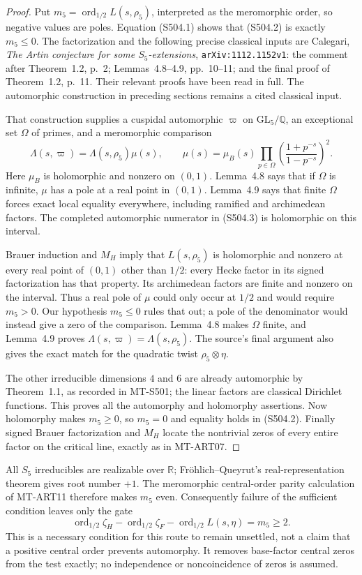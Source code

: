 \begin{proof}
Put $m_5=\operatorname{ord}_{1/2}L(s,\rho_5)$, interpreted
as the meromorphic order, so negative values are poles.
Equation (S504.1) shows that (S504.2) is exactly $m_5\le0$.
The factorization and the following precise classical inputs
are Calegari, \emph{The Artin conjecture for some
$S_5$-extensions}, \texttt{arXiv:1112.1152v1}: the comment
after Theorem~1.2, p.~2; Lemmas~4.8--4.9, pp.~10--11;
and the final proof of Theorem~1.2, p.~11. Their relevant
proofs have been read in full. The automorphic construction
in preceding sections remains a cited classical input.

That construction supplies a cuspidal automorphic
$\varpi$ on $\mathrm{GL}_5/\mathbb Q$, an exceptional set
$\Omega$ of primes, and a meromorphic comparison
\[
 \Lambda(s,\varpi)=\Lambda(s,\rho_5)\mu(s),\qquad
 \mu(s)=\mu_B(s)
       \prod_{p\in\Omega}
             \left(\frac{1+p^{-s}}{1-p^{-s}}\right)^2.
 \tag{S504.3}
\]
Here $\mu_B$ is holomorphic and nonzero on $(0,1)$.
Lemma~4.8 says that if $\Omega$ is infinite, $\mu$ has
a pole at a real point in $(0,1)$. Lemma~4.9 says that
finite $\Omega$ forces exact local equality everywhere,
including ramified and archimedean factors. The completed
automorphic numerator in (S504.3) is holomorphic on this
interval.

Brauer induction and $M_H$ imply that $L(s,\rho_5)$ is
holomorphic and nonzero at every real point of $(0,1)$
other than $1/2$: every Hecke factor in its signed
factorization has that property. Its archimedean factors
are finite and nonzero on the interval. Thus a real pole
of $\mu$ could only occur at $1/2$ and would require
$m_5>0$. Our hypothesis $m_5\le0$ rules that out;
a pole of the denominator would instead give a zero
of the comparison. Lemma~4.8 makes $\Omega$ finite,
and Lemma~4.9 proves $\Lambda(s,\varpi)=\Lambda(s,\rho_5)$.
The source's final argument also gives the exact match
for the quadratic twist $\rho_5\otimes\eta$.

The other irreducible dimensions $4$ and $6$ are already
automorphic by Theorem~1.1, as recorded in MT-S501;
the linear factors are classical Dirichlet functions.
This proves all the automorphy and holomorphy assertions.
Now holomorphy makes $m_5\ge0$, so $m_5=0$ and equality
holds in (S504.2). Finally signed Brauer factorization
and $M_H$ locate the nontrivial zeros of every entire
factor on the critical line, exactly as in MT-ART07.
\end{proof}

All $S_5$ irreducibles are realizable over $\mathbb R$;
Fr\"ohlich--Queyrut's real-representation theorem gives
root number $+1$. The meromorphic central-order parity
calculation of MT-ART11 therefore makes $m_5$ even.
Consequently failure of the sufficient condition leaves
only the gate
\[
 \operatorname{ord}_{1/2}\zeta_H
       -\operatorname{ord}_{1/2}\zeta_F
       -\operatorname{ord}_{1/2}L(s,\eta)
                       =m_5\ge2.
 \tag{S504.4}
\]
This is a necessary condition for this route to remain
unsettled, not a claim that a positive central order
prevents automorphy. It removes base-factor central zeros
from the test exactly; no independence or noncoincidence
of zeros is assumed.


